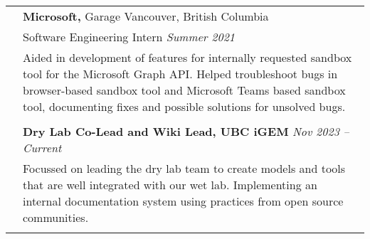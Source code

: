 \documentclass[letterpaper, 11pt]{article}
\begin{document}
\begin{longtable}{p{1.3in}p{4.8in}}
	 & {\textbf{Microsoft,}} Garage \hfill Vancouver, British Columbia                                                                                                                                                                                                                                                                                                                           \\
	 & Software Engineering Intern \hfill \textit{Summer 2021}                                                                                                                                                                                                                                                                                                                                   \\
	 & Aided in development of features for internally requested sandbox tool for the Microsoft Graph API. Helped troubleshoot bugs in browser-based sandbox tool and Microsoft Teams based sandbox tool, documenting fixes and possible solutions for unsolved bugs.                                                                                                                \\
	 &                                                                                                                                                                                                                                                                                                                                                                                           \\

	\color{Blue}{Service and outreach}
	 & \textbf{Dry Lab Co-Lead and Wiki Lead, UBC iGEM} \hfill \textit{Nov 2023 -- Current}                                                                                                                                                                                                                                                                                                      \\
	 & Focussed on leading the dry lab team to create models and tools that are well integrated with our wet lab. Implementing an internal documentation system using practices from open source communities.                                                                                                                                                                                    \\
	 &                                                                                                                                                                                                                                                                                                                                                                                           \\


\end{longtable}
\end{document}
